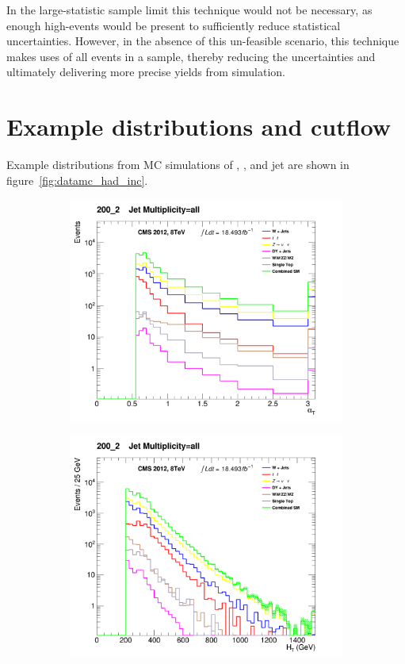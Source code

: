 In the large-statistic sample limit this technique would not be necessary,
as enough high-\nb events would be present to sufficiently reduce statistical
uncertainties. However, in the absence of this un-feasible scenario,
this technique
makes uses of all events in a sample, thereby reducing the uncertainties
and ultimately delivering more precise yields from simulation.


\section{Example distributions and cutflow}

Example distributions from MC simulations of \alphat, \HT, \mht and jet \Pt  are
shown in figure~\ref{fig:datamc_had_inc}.

\begin{figure}[!ht]
  \centering
    \begin{subfigure}[b]{0.48\textwidth}
      \includegraphics[width=\textwidth]{Figs/datamc/had/v1/AlphaT_all_200_upwards}
      \caption{\alphat}
    \end{subfigure}
    \begin{subfigure}[b]{0.48\textwidth}
      \includegraphics[width=\textwidth]{Figs/datamc/had/v1/HT_all_200_upwards}

\end{subfigure}
\end{figure}

